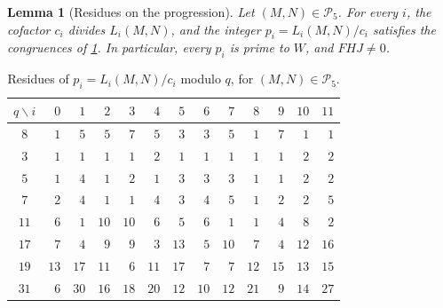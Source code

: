 \documentclass[12pt,oneside,openany]{book}
\theoremstyle{definition}
\theoremstyle{plain}
\numberwithin{equation}{chapter}
\theoremstyle{plain}
\newtheorem{lemma}[lemma]{Lemma}
\theoremstyle{definition}
\theoremstyle{remark}
\newcommand{\cP}{\mathcal P}
\begin{document}
\begin{lemma}[Residues on the progression]\label{lem:r5-progression}
Let $(M,N)\in\cP_5$. For every $i$, the cofactor $c_i$ divides $L_i(M,N)$, and the integer $p_i=L_i(M,N)/c_i$ satisfies the congruences of \cref{tab:r5-residues}. In particular, every $p_i$ is prime to $W$, and $FHJ\ne0$.
\end{lemma}

\begin{table}[htbp]
\centering
\caption{Residues of $p_i=L_i(M,N)/c_i$ modulo $q$, for $(M,N)\in\cP_5$.}\label{tab:r5-residues}
\begin{tabular}{c*{12}{r}}
\toprule
$q\backslash i$ & $0$ & $1$ & $2$ & $3$ & $4$ & $5$ & $6$ & $7$ & $8$ & $9$ & $10$ & $11$\\
\midrule
$8$ & $1$ & $5$ & $5$ & $7$ & $5$ & $3$ & $3$ & $5$ & $1$ & $7$ & $1$ & $1$\\
$3$ & $1$ & $1$ & $1$ & $1$ & $2$ & $1$ & $1$ & $1$ & $1$ & $1$ & $2$ & $2$\\
$5$ & $1$ & $4$ & $1$ & $2$ & $1$ & $3$ & $3$ & $3$ & $1$ & $1$ & $2$ & $2$\\
$7$ & $2$ & $4$ & $1$ & $1$ & $4$ & $3$ & $4$ & $5$ & $1$ & $2$ & $2$ & $5$\\
$11$ & $6$ & $1$ & $10$ & $10$ & $6$ & $5$ & $6$ & $1$ & $1$ & $4$ & $8$ & $2$\\
$17$ & $7$ & $4$ & $9$ & $9$ & $3$ & $13$ & $5$ & $10$ & $7$ & $4$ & $12$ & $16$\\
$19$ & $13$ & $17$ & $11$ & $6$ & $11$ & $17$ & $7$ & $7$ & $12$ & $15$ & $13$ & $15$\\
$31$ & $6$ & $30$ & $16$ & $18$ & $20$ & $12$ & $10$ & $12$ & $21$ & $9$ & $14$ & $27$\\
\bottomrule
\end{tabular}
\end{table}
\end{document}
